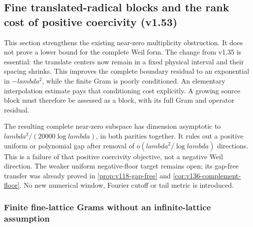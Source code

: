 \documentclass[11pt]{article}
\def\lambda{lambda}%
\theoremstyle{remark}
\begin{document}
\subsection{Fine translated-radical blocks and the rank cost of positive coercivity (v1.53)}
\label{sec:v153-fine-block}
This section strengthens the existing near-zero multiplicity obstruction.
It does not prove a lower bound for the complete Weil form. The change
from v1.35 is essential: the translate centers now remain in a fixed
physical interval and their spacing shrinks. This improves the complete
boundary residual to an exponential in $-\lambda^2$, while the finite
Gram is poorly conditioned. An elementary interpolation estimate pays
that conditioning cost explicitly. A growing source block must therefore
be assessed as a block, with its full Gram and operator residual.

The resulting complete near-zero subspace has dimension asymptotic to
$\lambda^2/(20000\log\lambda)$, in both parities together. It rules out
a positive uniform or polynomial gap after removal of
$o(\lambda^2/\log\lambda)$ directions. This is a failure of that positive
coercivity objective, not a negative Weil direction. The weaker uniform
negative-floor target remains open; its gap-free transfer was already
proved in \ref{prop:v118-gap-free} and \ref{cor:v136-complement-floor}.
No new numerical window, Fourier cutoff or tail metric is introduced.

\subsubsection{Finite fine-lattice Grams without an infinite-lattice assumption}
\end{document}
